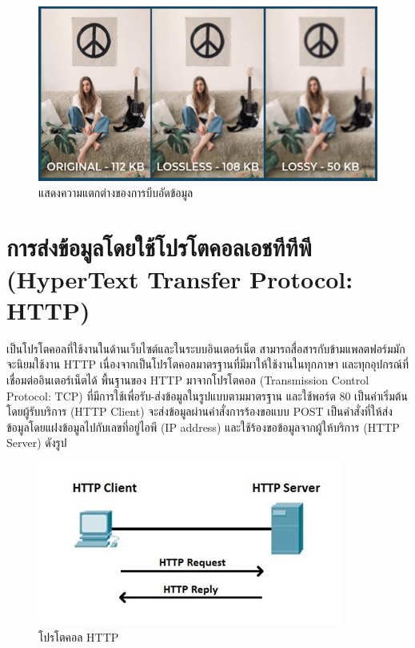 \begin{figure}[!ht]
  \begin{center}
    \includegraphics[scale=.7]{pic/compressiom.png}
    \caption[Poem]{แสดงความแตกต่างของการบีบอัดข้อมูล}
    \label{fig:compressiom}
  \end{center}
\end{figure}



\section{การส่งข้อมูลโดยใช้โปรโตคอลเอชทีทีพี (HyperText Transfer Protocol: HTTP) }
เป็นโปรโตคอลที่ใช้งานในด้านเว็บไซต์และในระบบอินเตอร์เน็ต สามารถสื่อสารกับข้ามแพลตฟอร์มมักจะนิยมใช้งาน HTTP 
เนื่องจากเป็นโปรโตคอลมาตรฐานที่มีมาให้ใช้งานในทุกภาษา และทุกอุปกรณ์ที่เชื่อมต่ออินเตอร์เน็ตได้ พื้นฐานของ HTTP มาจากโปรโตคอล (Transmission Control Protocol: TCP) 
ที่มีการใช้เพื่อรับ-ส่งข้อมูลในรูปแบบตามมาตรฐาน และใช้พอร์ต 80 เป็นค่าเริ่มต้น โดยผู้รับบริการ (HTTP Client) จะส่งข้อมูลผ่านคำสั่งการร้องขอแบบ POST 
เป็นคำสั่งที่ให้ส่งข้อมูลโดยแฝงข้อมูลไปกับเลขที่อยู่ไอพี (IP address) และใช้ร้องขอข้อมูลจากผู้ให้บริการ (HTTP Server) \cite{Http} ดังรูป

\begin{figure}[!ht]
  \begin{center}
    \includegraphics[scale=.8]{pic/http.jpg}
    \caption[Poem]{โปรโตคอล HTTP}
    \label{fig:http}
  \end{center}
\end{figure}

